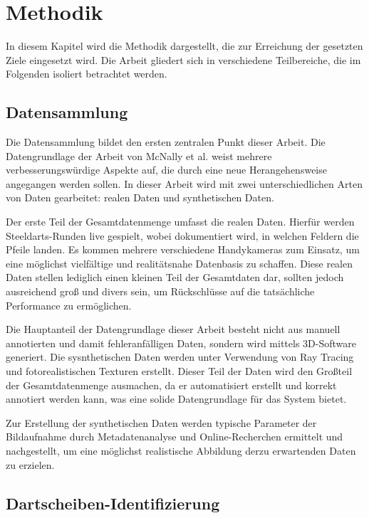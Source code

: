 \section{Methodik}
\label{sec:methodik}

In diesem Kapitel wird die Methodik dargestellt, die zur Erreichung der gesetzten Ziele eingesetzt wird. Die Arbeit gliedert sich in verschiedene Teilbereiche, die im Folgenden isoliert betrachtet werden.

\subsection{Datensammlung}
\label{sec:methodik:datensammlung}

Die Datensammlung bildet den ersten zentralen Punkt dieser Arbeit. Die Datengrundlage der Arbeit von McNally et al. weist mehrere verbesserungswürdige Aspekte auf, die durch eine neue Herangehensweise angegangen werden sollen. In dieser Arbeit wird mit zwei unterschiedlichen Arten von Daten gearbeitet: realen Daten und synthetischen Daten.

Der erste Teil der Gesamtdatenmenge umfasst die realen Daten. Hierfür werden Steeldarts-Runden live gespielt, wobei dokumentiert wird, in welchen Feldern die Pfeile landen. Es kommen mehrere verschiedene Handykameras zum Einsatz, um eine möglichst vielfältige und realitätsnahe Datenbasis zu schaffen. Diese realen Daten stellen lediglich einen kleinen Teil der Gesamtdaten dar, sollten jedoch ausreichend groß und divers sein, um Rückschlüsse auf die tatsächliche Performance zu ermöglichen.

Die Hauptanteil der Datengrundlage dieser Arbeit besteht nicht aus manuell annotierten und damit fehleranfälligen Daten, sondern wird mittels 3D-Software generiert. Die sysnthetischen Daten werden unter Verwendung von Ray Tracing und fotorealistischen Texturen erstellt. Dieser Teil der Daten wird den Großteil der Gesamtdatenmenge ausmachen, da er automatisiert erstellt und korrekt annotiert werden kann, was eine solide Datengrundlage für das System bietet.

Zur Erstellung der synthetischen Daten werden typische Parameter der Bildaufnahme durch Metadatenanalyse und Online-Recherchen ermittelt und nachgestellt, um eine möglichst realistische Abbildung derzu erwartenden Daten zu erzielen.

\subsection{Dartscheiben-Identifizierung}
\label{sec:methodik:dartscheibe}

